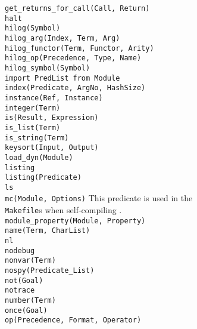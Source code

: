 \begin{tabbing}
 \> {\tt get\_returns\_for\_call(Call, Return)} \>			\\
 \> {\tt halt}			\>					\\
 \> {\tt hilog(Symbol)}		\>					\\
 \> {\tt hilog\_arg(Index, Term, Arg)}	\>				\\
 \> {\tt hilog\_functor(Term, Functor, Arity)} \>			\\
 \> {\tt hilog\_op(Precedence, Type, Name)} \>				\\
 \> {\tt hilog\_symbol(Symbol)}	\>					\\
 \> {\tt import PredList from Module} \>				\\
 \> {\tt index(Predicate, ArgNo, HashSize)} \>				\\
 \> {\tt instance(Ref, Instance)} \>					\\
 \> {\tt integer(Term)}		\>					\\
 \> {\tt is(Result, Expression)} \>					\\
 \> {\tt is\_list(Term)}	\>					\\
 \> {\tt is\_string(Term)}	\>					\\
 \> {\tt keysort(Input, Output)} \>					\\
 \> {\tt load\_dyn(Module)}	\>					\\
 \> {\tt listing}		\>					\\
 \> {\tt listing(Predicate)}	\>					\\
 \> {\tt ls}			\>					\\
 \> {\tt mc(Module, Options)}	\> This predicate is used in the 	\\
 \>				\> {\tt Makefile}s when self-compiling 
				   \ourprolog.	\\
 \> {\tt module\_property(Module, Property)} \>				\\
 \> {\tt name(Term, CharList)}	\>					\\
 \> {\tt nl}			\>					\\
 \> {\tt nodebug}		\>					\\
 \> {\tt nonvar(Term)}		\>					\\
 \> {\tt nospy(Predicate\_List)} \>					\\
 \> {\tt not(Goal)}		\>					\\
 \> {\tt notrace}		\>					\\
 \> {\tt number(Term)}		\>					\\
 \> {\tt once(Goal)}		\>					\\
 \> {\tt op(Precedence, Format, Operator)} \>				\\

\end{tabbing}
